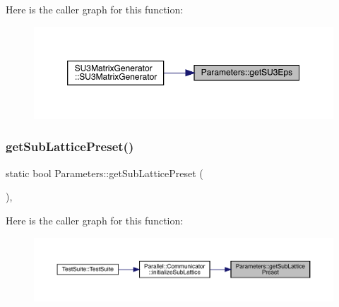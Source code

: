 Here is the caller graph for this function\+:
\nopagebreak
\begin{figure}[H]
\begin{center}
\leavevmode
\includegraphics[width=350pt]{class_parameters_ac14d1b11099fdfa254fb138d4471ceb2_icgraph}
\end{center}
\end{figure}
\mbox{\label{class_parameters_ab9d9f206373cdad11d48ab08222204e3}} 
\subsubsection{\texorpdfstring{getSubLatticePreset()}{getSubLatticePreset()}}
{\footnotesize\ttfamily static bool Parameters\+::get\+Sub\+Lattice\+Preset (\begin{DoxyParamCaption}{ }\end{DoxyParamCaption})\hspace{0.3cm}{\ttfamily [inline]}, {\ttfamily [static]}}

Here is the caller graph for this function\+:
\nopagebreak
\begin{figure}[H]
\begin{center}
\leavevmode
\includegraphics[width=350pt]{class_parameters_ab9d9f206373cdad11d48ab08222204e3_icgraph}
\end{center}
\end{figure}
\mbox{\label{class_parameters_aff629ab94d99807364926008fb4e1e67}} 
